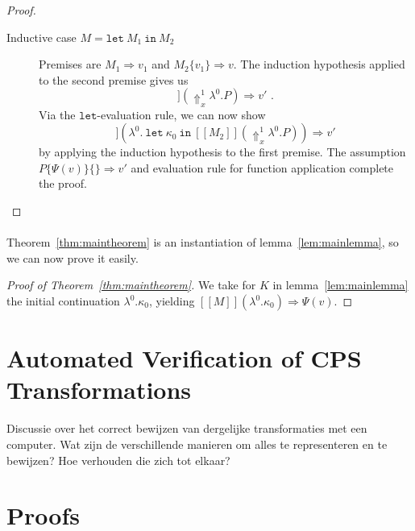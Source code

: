 \documentclass[a4paper,11pt,draft]{article}
\newcommand{\kw}[1]{\mathtt{#1}}
\begin{document}
\begin{proof}
\begin{description}
\item[\sffamily Inductive case $M = \kw{let} \: M_{1} \: \kw{in} \: M_{2}$]\hfill

  Premises are $M_{1} \Rightarrow v_{1}$ and $M_{2}\{v_{1}\} \Rightarrow v$. The
  induction hypothesis applied to the second premise gives us
  \begin{equation*}
    [\![M_{2}\{v_{1}\}]\!] (\Uparrow_{x}^{1} \lambda^{0}.P)
    \Rightarrow v' \text{ .}
  \end{equation*}
  Via the $\kw{let}$-evaluation rule, we can now show
  \begin{equation*}
    [\![M_{1}]\!]
    (\lambda^{0}. \: \kw{let} \: \kappa_{0} \: \kw{in} \: [\![M_{2}]\!]
    (\Uparrow_{x}^{1} \lambda^{0}.P)) \Rightarrow v'
  \end{equation*}
  by applying the induction hypothesis to the first premise.
  The assumption $P\{\Psi(v)\}\{\} \Rightarrow v'$ and evaluation rule for
  function application complete the proof.\qedhere
\end{description}
\end{proof}

\paragraph{}

Theorem~\ref{thm:maintheorem} is an instantiation of
lemma~\ref{lem:mainlemma}, so we can now prove it easily.

\begin{proof}[Proof of Theorem~\ref{thm:maintheorem}]
We take for $K$ in lemma~\ref{lem:mainlemma} the initial continuation
$\lambda^{0}.\kappa_{0}$, yielding
$[\![M]\!] (\lambda^{0}.\kappa_{0}) \Rightarrow \Psi(v)$.
\end{proof}


\section{Automated Verification of CPS Transformations}\label{sec:automated}

Discussie over het correct bewijzen van dergelijke transformaties met een
computer. Wat zijn de verschillende manieren om alles te representeren en te
bewijzen? Hoe verhouden die zich tot elkaar?


\appendix


\section{Proofs}\label{sec:proofs}
\end{document}
